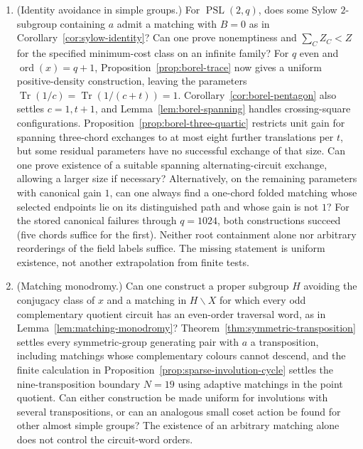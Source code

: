 \documentclass[11pt,a4paper]{article}
\theoremstyle{definition}
\theoremstyle{remark}
\newcommand{\ord}{\operatorname{ord}}
\newcommand{\PSL}{\operatorname{PSL}}
\begin{document}
\begin{enumerate}[leftmargin=2em]
\item (Identity avoidance in simple groups.)  For $\PSL(2,q)$, does some Sylow $2$-subgroup containing $a$ admit a matching with $B=0$ as in Corollary~\ref{cor:sylow-identity}?  Can one prove nonemptiness and $\sum_C Z_C<Z$ for the specified minimum-cost class on an infinite family?  For $q$ even and $\ord(x)=q+1$, Proposition~\ref{prop:borel-trace} now gives a uniform positive-density construction, leaving the parameters $\operatorname{Tr}(1/c)=\operatorname{Tr}(1/(c+t))=1$.  Corollary~\ref{cor:borel-pentagon} also settles $c=1,t+1$, and Lemma~\ref{lem:borel-spanning} handles crossing-square configurations.  Proposition~\ref{prop:borel-three-quartic} restricts unit gain for spanning three-chord exchanges to at most eight further translations per $t$, but some residual parameters have no successful exchange of that size.  Can one prove existence of a suitable spanning alternating-circuit exchange, allowing a larger size if necessary?  Alternatively, on the remaining parameters with canonical gain $1$, can one always find a one-chord folded matching whose selected endpoints lie on its distinguished path and whose gain is not $1$?  For the stored canonical failures through $q=1024$, both constructions succeed (five chords suffice for the first).  Neither root containment alone nor arbitrary reorderings of the field labels suffice.  The missing statement is uniform existence, not another extrapolation from finite tests.
\item (Matching monodromy.)  Can one construct a proper subgroup $H$ avoiding the conjugacy class of $x$ and a matching in $H\backslash X$ for which every odd complementary quotient circuit has an even-order traversal word, as in Lemma~\ref{lem:matching-monodromy}?  Theorem~\ref{thm:symmetric-transposition} settles every symmetric-group generating pair with $a$ a transposition, including matchings whose complementary colours cannot descend, and the finite calculation in Proposition~\ref{prop:sparse-involution-cycle} settles the nine-transposition boundary $N=19$ using adaptive matchings in the point quotient.  Can either construction be made uniform for involutions with several transpositions, or can an analogous small coset action be found for other almost simple groups?  The existence of an arbitrary matching alone does not control the circuit-word orders.

\end{enumerate}
\end{document}

